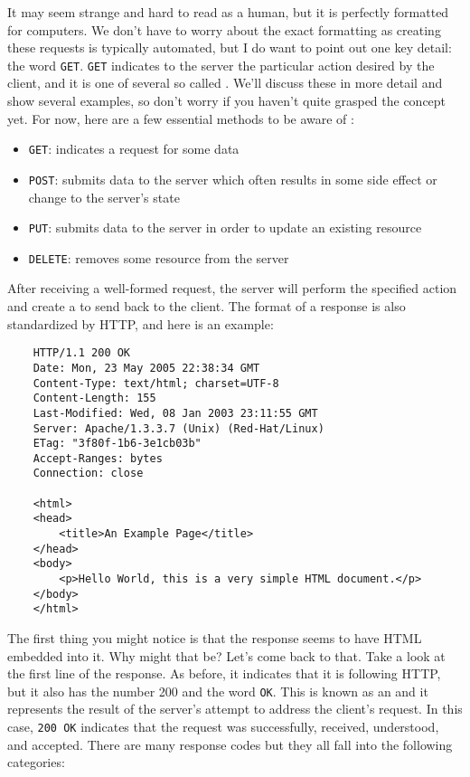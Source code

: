 It may seem strange and hard to read as a human, but it is perfectly formatted for computers. We don't have to worry about the exact formatting as creating these requests is typically automated, but I do want to point out one key detail: the word \texttt{GET}. \texttt{GET} indicates to the server the particular action desired by the client, and it is one of several so called . We'll discuss these in more detail and show several examples, so don't worry if you haven't quite grasped the concept yet. For now, here are a few essential methods to be aware of : 

\begin{itemize}
    \item \texttt{GET}: indicates a request for some data
    \item \texttt{POST}: submits data to the server which often results in some side effect or change to the server's state
    \item \texttt{PUT}: submits data to the server in order to update an existing resource
    \item \texttt{DELETE}: removes some resource from the server
\end{itemize}

After receiving a well-formed request, the server will perform the specified action and create a  to send back to the client. The format of a response is also standardized by HTTP, and here is an example:

\begin{lstlisting}
    HTTP/1.1 200 OK
    Date: Mon, 23 May 2005 22:38:34 GMT
    Content-Type: text/html; charset=UTF-8
    Content-Length: 155
    Last-Modified: Wed, 08 Jan 2003 23:11:55 GMT
    Server: Apache/1.3.3.7 (Unix) (Red-Hat/Linux)
    ETag: "3f80f-1b6-3e1cb03b"
    Accept-Ranges: bytes
    Connection: close

    <html>
    <head>
        <title>An Example Page</title>
    </head>
    <body>
        <p>Hello World, this is a very simple HTML document.</p>
    </body>
    </html>
\end{lstlisting}


The first thing you might notice is that the response seems to have HTML embedded into it. Why might that be? Let's come back to that. Take a look at the first line of the response. As before, it indicates that it is following HTTP, but it also has the number 200 and the word \texttt{OK}. This is known as an  and it represents the result of the server's attempt to address the client's request. In this case, \texttt{200 OK} indicates that the request was successfully, received, understood, and accepted. There are many response codes but they all fall into the following categories:

